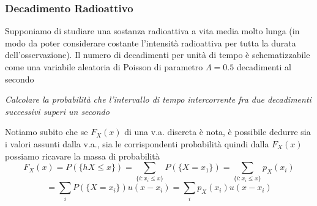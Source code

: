 \subsubsection{Decadimento Radioattivo}\label{sec:Decadimento Radioattivo} %
Supponiamo di studiare una sostanza radioattiva a vita media molto lunga
(in modo da poter considerare costante l’intensità radioattiva per tutta la
durata dell’osservazione). Il numero di decadimenti per unità di tempo è schematizzabile come una
variabile aleatoria di Poisson di parametro $\Lambda = 0.5$ decadimenti al secondo
\begin{importantbox}
    \textit{Calcolare la probabilità che l’intervallo di tempo intercorrente fra due
    decadimenti successivi superi un secondo}
\end{importantbox}
Notiamo subito che se  $F_X(x)$ di una v.a. discreta
è nota, è possibile dedurre sia i valori assunti dalla v.a., sia le
corrispondenti probabilità quindi dalla $F_X(x)$ possiamo ricavare la massa di probabilità
\[
    F_X(x) = P(\{hX \leq x\}) = \sum_{\{i: x_i \leq x\}} P(\{X = x_1\}) = \sum_{\{i: x_i \leq x\}} p_X(x_i)
\]
\[
    = \sum_i P(\{X = x_i\})u(x - x_i) = \sum_i p_X(x_i)u(x - x_i)
\]


